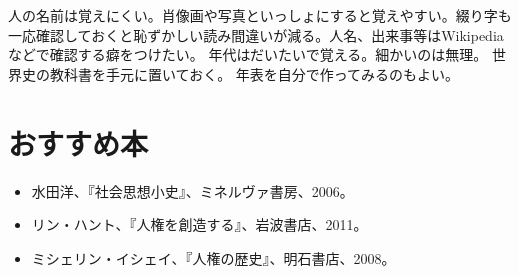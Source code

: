 \documentclass[uplatex,dvipdfmx]{jsarticle}
\begin{document}
 人の名前は覚えにくい。肖像画や写真といっしょにすると覚えやすい。綴り字も一応確認しておくと恥ずかしい読み間違いが減る。人名、出来事等はWikipediaなどで確認する癖をつけたい。
 年代はだいたいで覚える。細かいのは無理。
 世界史の教科書を手元に置いておく。
 年表を自分で作ってみるのもよい。





\section{おすすめ本}
\begin{itemize}
\item 水田洋、『社会思想小史』、ミネルヴァ書房、2006。
\item リン・ハント、『人権を創造する』、岩波書店、2011。
\item ミシェリン・イシェイ、『人権の歴史』、明石書店、2008。

\end{itemize}

\ifx\mybook\undefined


%   
% 
\end{document}
